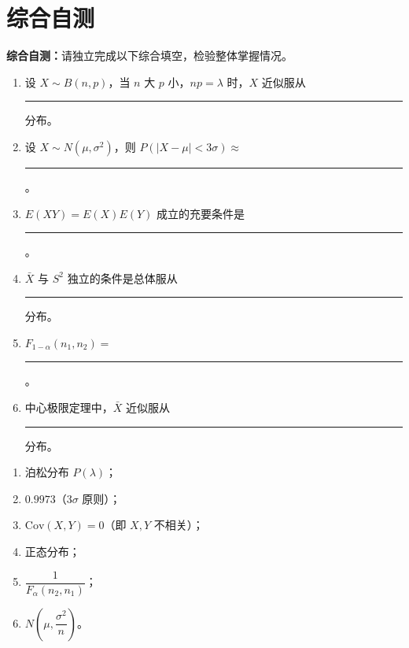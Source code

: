 \documentclass[11pt,a4paper]{article}
\newcommand{\blankbox}[1]{%
  \textcolor{blankyellow}{\rule[-0.1cm]{#1}{0.5cm}}%
}
\begin{document}
\section*{综合自测}

\begin{tipbox}
\textbf{综合自测：}请独立完成以下综合填空，检验整体掌握情况。
\end{tipbox}

\begin{formulabox}[综合填空]
\begin{enumerate}[leftmargin=2em]
  \item 设 $X\sim B(n,p)$，当 $n$ 大 $p$ 小，$np=\lambda$ 时，$X$ 近似服从\blankbox{2cm}分布。
  \item 设 $X\sim N(\mu,\sigma^2)$，则 $P(|X-\mu|<3\sigma)\approx$\blankbox{2cm}。
  \item $E(XY)=E(X)E(Y)$ 成立的充要条件是\blankbox{3cm}。
  \item $\bar X$ 与 $S^2$ 独立的条件是总体服从\blankbox{2cm}分布。
  \item $F_{1-\alpha}(n_1,n_2)=$\blankbox{3cm}。
  \item 中心极限定理中，$\bar X$ 近似服从\blankbox{3cm}分布。
\end{enumerate}
\end{formulabox}

\begin{answerbox}
\begin{enumerate}[leftmargin=2em]
  \item 泊松分布 $P(\lambda)$；
  \item $0.9973$（$3\sigma$ 原则）；
  \item $\mathrm{Cov}(X,Y)=0$（即 $X,Y$ 不相关）；
  \item 正态分布；
  \item $\dfrac{1}{F_{\alpha}(n_2,n_1)}$；
  \item $N\!\left(\mu,\dfrac{\sigma^2}{n}\right)$。
\end{enumerate}
\end{answerbox}
\end{document}
